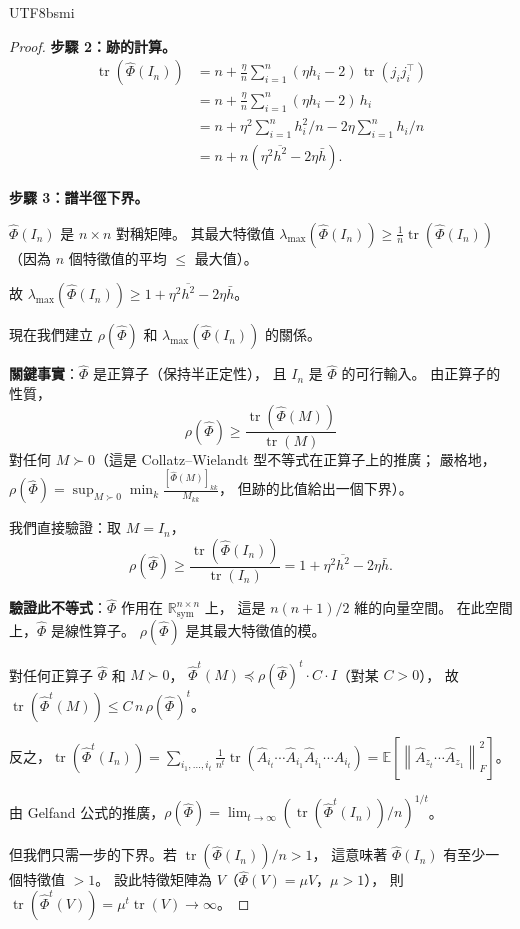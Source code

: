 \documentclass[11pt,a4paper]{article}
\theoremstyle{definition}
\DeclareMathOperator{\tr}{tr}
\newcommand{\R}{\mathbb{R}}
\newcommand{\E}{\mathbb{E}}
\newcommand{\norm}[1]{\left\|#1\right\|}
\begin{document}
\begin{CJK}{UTF8}{bsmi}
\begin{proof}
  \textbf{步驟 2：跡的計算。}
  \begin{align*}
    \tr(\hat\Phi(I_n))
    &= n + \frac{\eta}{n}\sum_{i=1}^n (\eta h_i - 2)\,\tr(j_i j_i^\top) \\
    &= n + \frac{\eta}{n}\sum_{i=1}^n (\eta h_i - 2)\,h_i \\
    &= n + \eta^2\sum_{i=1}^n h_i^2/n - 2\eta\sum_{i=1}^n h_i/n \\
    &= n + n(\eta^2\overline{h^2} - 2\eta\bar{h}).
  \end{align*}

  \textbf{步驟 3：譜半徑下界。}

  $\hat\Phi(I_n)$ 是 $n \times n$ 對稱矩陣。
  其最大特徵值 $\lambda_{\max}(\hat\Phi(I_n)) \geq \frac{1}{n}\tr(\hat\Phi(I_n))$
  （因為 $n$ 個特徵值的平均 $\leq$ 最大值）。

  故 $\lambda_{\max}(\hat\Phi(I_n)) \geq 1 + \eta^2\overline{h^2} - 2\eta\bar{h}$。

  現在我們建立 $\rho(\hat\Phi)$ 和 $\lambda_{\max}(\hat\Phi(I_n))$ 的關係。

  \textbf{關鍵事實}：$\hat\Phi$ 是正算子（保持半正定性），
  且 $I_n$ 是 $\hat\Phi$ 的可行輸入。
  由正算子的性質，
  \[
    \rho(\hat\Phi) \geq \frac{\tr(\hat\Phi(M))}{\tr(M)}
  \]
  對任何 $M \succ 0$（這是 Collatz--Wielandt 型不等式在正算子上的推廣；
  嚴格地，$\rho(\hat\Phi) = \sup_{M \succ 0} \min_k \frac{[\hat\Phi(M)]_{kk}}{M_{kk}}$，
  但跡的比值給出一個下界）。

  我們直接驗證：取 $M = I_n$，
  \[
    \rho(\hat\Phi) \geq \frac{\tr(\hat\Phi(I_n))}{\tr(I_n)} = 1 + \eta^2\overline{h^2} - 2\eta\bar{h}.
  \]

  \textbf{驗證此不等式}：$\hat\Phi$ 作用在 $\R^{n \times n}_{\text{sym}}$ 上，
  這是 $n(n+1)/2$ 維的向量空間。
  在此空間上，$\hat\Phi$ 是線性算子。
  $\rho(\hat\Phi)$ 是其最大特徵值的模。

  對任何正算子 $\hat\Phi$ 和 $M \succ 0$，
  $\hat\Phi^t(M) \preceq \rho(\hat\Phi)^t \cdot C \cdot I$（對某 $C > 0$），
  故 $\tr(\hat\Phi^t(M)) \leq C\,n\,\rho(\hat\Phi)^t$。

  反之，$\tr(\hat\Phi^t(I_n)) = \sum_{i_1,\ldots,i_t} \frac{1}{n^t}\tr(\hat{A}_{i_t}\cdots\hat{A}_{i_1}\hat{A}_{i_1}\cdots\hat{A}_{i_t})
  = \E[\norm{\hat{A}_{z_t}\cdots\hat{A}_{z_1}}_F^2]$。

  由 Gelfand 公式的推廣，$\rho(\hat\Phi) = \lim_{t\to\infty}(\tr(\hat\Phi^t(I_n))/n)^{1/t}$。

  但我們只需一步的下界。若 $\tr(\hat\Phi(I_n))/n > 1$，
  這意味著 $\hat\Phi(I_n)$ 有至少一個特徵值 $> 1$。
  設此特徵矩陣為 $V$（$\hat\Phi(V) = \mu V$，$\mu > 1$），
  則 $\tr(\hat\Phi^t(V)) = \mu^t\tr(V) \to \infty$。


\end{proof}
\end{CJK}
\end{document}

